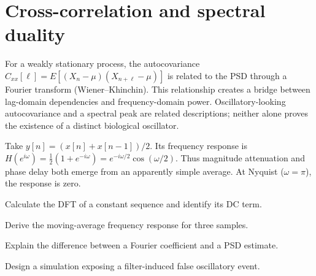 \section{Cross-correlation and spectral duality}
For a weakly stationary process, the autocovariance $C_{xx}[\ell]=E[(X_n-\mu)(X_{n+\ell}-\mu)]$ is related to the PSD through a Fourier transform (Wiener--Khinchin). This relationship creates a bridge between lag-domain dependencies and frequency-domain power. Oscillatory-looking autocovariance and a spectral peak are related descriptions; neither alone proves the existence of a distinct biological oscillator.

\begin{workedexample}
Take $y[n]=(x[n]+x[n-1])/2$. Its frequency response is $H(e^{i\omega})=\tfrac12(1+e^{-i\omega})=e^{-i\omega/2}\cos(\omega/2)$. Thus magnitude attenuation and phase delay both emerge from an apparently simple average. At Nyquist ($\omega=\pi$), the response is zero.
\end{workedexample}
\begin{exercises}
\item Calculate the DFT of a constant sequence and identify its DC term.
\item Derive the moving-average frequency response for three samples.
\item Explain the difference between a Fourier coefficient and a PSD estimate.
\item Design a simulation exposing a filter-induced false oscillatory event.
\end{exercises}